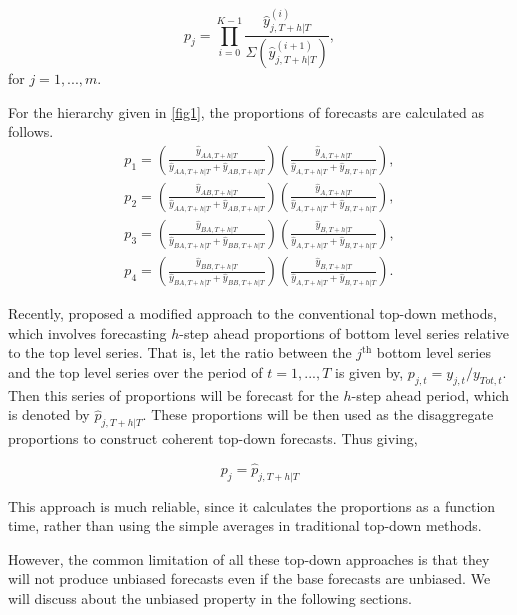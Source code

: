 \documentclass[graybox]{svmult}
\begin{document}
\begin{equation}\label{PoF}
p_j=\prod_{i=0}^{K-1}\frac{\hat{y}^{(i)}_{j,T+h|T}}{\Sigma(\hat{y}^{(i+1)}_{j,T+h|T})},
\end{equation}  
for $j=1,...,m$.

For the hierarchy given in \ref{fig1}, the proportions of forecasts are calculated as follows. 
\begin{eqnarray}
p_1=\left(\frac{\hat{y}_{AA,T+h|T}}{\hat{y}_{AA,T+h|T} + \hat{y}_{AB,T+h|T}}\right) \left(\frac{\hat{y}_{A,T+h|T}}{\hat{y}_{A,T+h|T} + \hat{y}_{B,T+h|T}}\right),\\
p_2=\left(\frac{\hat{y}_{AB,T+h|T}}{\hat{y}_{AA,T+h|T} + \hat{y}_{AB,T+h|T}}\right) \left( \frac{\hat{y}_{A,T+h|T}}{\hat{y}_{A,T+h|T} + \hat{y}_{B,T+h|T}}\right),\\
p_3=\left(\frac{\hat{y}_{BA,T+h|T}}{\hat{y}_{BA,T+h|T} + \hat{y}_{BB,T+h|T}}\right) \left( \frac{\hat{y}_{B,T+h|T}}{\hat{y}_{A,T+h|T} + \hat{y}_{B,T+h|T}}\right),\\
p_4=\left(\frac{\hat{y}_{BB,T+h|T}}{\hat{y}_{BA,T+h|T} + \hat{y}_{BB,T+h|T}}\right) \left( \frac{\hat{y}_{B,T+h|T}}{\hat{y}_{A,T+h|T} + \hat{y}_{B,T+h|T}}\right).
\end{eqnarray} 

Recently, \cite{Mircetic2017} proposed a modified approach to the conventional top-down methods, which involves forecasting $h$-step ahead proportions of bottom level series relative to the top level series. That is, let the ratio between the $j^\text{th}$ bottom level series and the top level series over the period of $t=1,...,T$ is given by, $p_{j,t}=y_{j,t}/y_{Tot,t}$. Then this series of proportions will be forecast for the $h$-step ahead period, which is denoted by $\hat{p}_{j,T+h|T}$. These proportions will be then used as the disaggregate proportions to construct coherent top-down forecasts. Thus giving,

\begin{equation}
p_j = \hat{p}_{j,T+h|T}
\end{equation}   

This approach is much reliable, since it calculates the proportions as a function time, rather than using the simple averages in traditional top-down methods. 

However, the common limitation of all these top-down approaches is that they will not produce unbiased forecasts even if the base forecasts are unbiased. We will discuss about the unbiased property in the following sections. 
\end{document}
